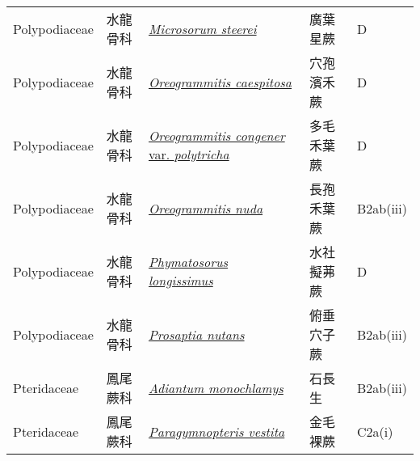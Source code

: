 {\begin{longtable}{L{2.5cm}L{2cm}L{5cm}L{2.5cm}L{3cm}}
    Polypodiaceae & 水龍骨科 & \href{http://www.theplantlist.org/tpl1.1/search?q=Microsorum+steerei}{\textit{Microsorum steerei} } & 廣葉星蕨 & D    \\
    Polypodiaceae & 水龍骨科 & \href{http://www.theplantlist.org/tpl1.1/search?q=Oreogrammitis+caespitosa}{\textit{Oreogrammitis caespitosa} } & 穴孢濱禾蕨 & D    \\
    Polypodiaceae & 水龍骨科 & \href{http://www.theplantlist.org/tpl1.1/search?q=Oreogrammitis+congener+var.+polytricha}{\textit{Oreogrammitis congener} var. \textit{polytricha} } & 多毛禾葉蕨 & D    \\
    Polypodiaceae & 水龍骨科 & \href{http://www.theplantlist.org/tpl1.1/search?q=Oreogrammitis+nuda}{\textit{Oreogrammitis nuda} } & 長孢禾葉蕨 & B2ab(iii)    \\
    Polypodiaceae & 水龍骨科 & \href{http://www.theplantlist.org/tpl1.1/search?q=Phymatosorus+longissimus}{\textit{Phymatosorus longissimus} } & 水社擬茀蕨 & D    \\
    Polypodiaceae & 水龍骨科 & \href{http://www.theplantlist.org/tpl1.1/search?q=Prosaptia+nutans}{\textit{Prosaptia nutans} } & 俯垂穴子蕨 & B2ab(iii)    \\
    Pteridaceae & 鳳尾蕨科 & \href{http://www.theplantlist.org/tpl1.1/search?q=Adiantum+monochlamys}{\textit{Adiantum monochlamys} } & 石長生 & B2ab(iii)    \\
    Pteridaceae & 鳳尾蕨科 & \href{http://www.theplantlist.org/tpl1.1/search?q=Paragymnopteris+vestita}{\textit{Paragymnopteris vestita} } & 金毛裸蕨 & C2a(i)    \\

\end{longtable}}
